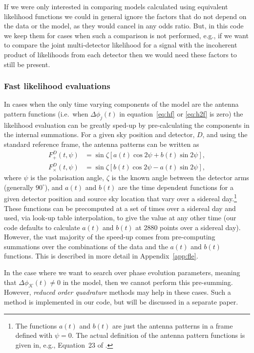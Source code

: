 If we were only interested in comparing models calculated using equivalent likelihood functions we could in
general ignore the factors that do not depend on the data or the model, as they would cancel in any odds
ratio. But, in this code we keep them for cases when such a comparison is not performed, e.g., if we
want to compare the joint multi-detector likelihood for a signal with the incoherent product of likelihoods
from each detector then we would need these factors to still be present.

\subsubsection{Fast likelihood evaluations}\label{sec:fastlike}

In cases when the only time varying components of the model are the antenna pattern functions (i.e.\ when 
$\Delta \phi_j(t)$ in equation~\ref{eq:hf} or \ref{eq:h2f} is zero) the likelihood
evaluation can be greatly sped-up by pre-calculating the components in the internal summations. For a given sky
position and detector, $D$, and using the standard reference frame, the antenna patterns can be written as \citep[following the form of]{1998PhRvD..58f3001J}
\begin{align}\label{eq:antenna}
F_+^D(t,\psi) &= \sin{\zeta}\left[a(t)\cos{2\psi} + b(t)\sin{2\psi}\right], \nonumber \\
F^D_{\times}(t,\psi) &= \sin{\zeta}\left[b(t)\cos{2\psi} - a(t)\sin{2\psi}\right],
\end{align}
where $\psi$ is the \gw polarisation angle, $\zeta$ is the known angle between the detector arms (generally
$90^{\circ}$), and $a(t)$ and $b(t)$ are the time dependent functions for a given detector position and
source sky location that vary over a sidereal day.\footnote{The functions $a(t)$ and $b(t)$ are just the antenna patterns
in a frame defined with $\psi=0$. The actual definition of the antenna pattern functions is given in, e.g., Equation~23 of
\citet{2015PhRvD..91h2002I}.} These functions can be precomputed at a set of times over
a sidereal day and used, via look-up table interpolation, to give the value at any other time (our code
defaults to calculate $a(t)$ and $b(t)$ at 2880 points over a sidereal day). However, the vast majority of the
speed-up comes from pre-computing summations over the combinations of the data and the $a(t)$ and $b(t)$ functions.
This is described in more detail in Appendix~\ref{app:fle}.

In the case where we want to search over phase evolution parameters, meaning that $\Delta\phi_{\mathcal{K}}(t) \ne 0$ in the model, then
we cannot perform this pre-summing. However, {\it reduced order quadrature} methods
\citep[e.g.][]{2014PhRvX...4c1006F, 2015PhRvL.114g1104C} may help in these cases. Such a method is implemented in our
code, but will be discussed in a separate paper.

